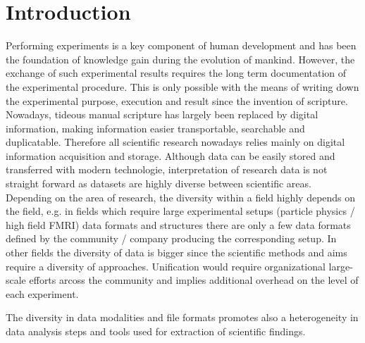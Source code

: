 \clearpage
\section{Introduction}
\label{sec:intro}

Performing experiments is a key component of human development and has been the foundation of knowledge gain during the evolution of mankind. However, the exchange of such experimental results requires the long term documentation of the  experimental procedure. This is only possible with the means of writing down the experimental purpose, execution and result since the invention of scripture. Nowadays, tideous manual scripture has largely been replaced by digital information, making information easier transportable, searchable and duplicatable. Therefore all scientific research nowadays relies mainly on digital information acquisition and storage. Although data can be easily stored and transferred with modern technologie, interpretation of research data is not straight forward as datasets are highly diverse between scientific areas. Depending on the area of research, the diversity within a field highly depends on the field, e.g. in fields which require large experimental setups (particle physics / high field FMRI) data formats and structures  there are only a few data formats defined by the community / company producing the corresponding setup. In other fields the diversity of data is bigger since the scientific methods and aims require a diversity of approaches. Unification would require organizational large-scale efforts arcoss the community and implies additional overhead on the level of each experiment.

The diversity in data modalities and file formats promotes also a heterogeneity in data analysis steps and tools used for extraction of scientific findings. 




